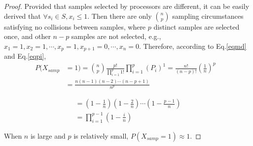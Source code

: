 \documentclass[sigconf]{acmart}
\begin{document}
\begin{proof}
Provided that samples selected by processors are different, it can be easily derived that $\forall s_i \in S, x_i \le 1.$
Then there are only $\binom {n} {p} $ sampling circumstances satisfying no collisions between samples, where  $p$ distinct samples are selected once, and other $n-p$ samples are not selected, e.g., $x_1=1,x_2=1,\cdots, x_{p}=1, x_{p+1}=0,\cdots,x_{n}=0$.
Therefore, according to Eq.\eqref{eqmd} and Eq.\eqref{eqpi}, 
\begin{align}
P(X_{samp}&=1) =\binom {n} {p}  \frac{p!}{\prod \limits_{i=1}^{p}1!}\prod \limits_{i=1}^{p} (P_{i})^1 
=\frac{n!} {(n-p)!} ( \frac{1}{n} )^{p}&\nonumber\\
&=\frac{n (n-1)(n-2) \cdots (n-p+1)}{{n}^{p}} &\nonumber
\end{align}

\begin{align}
&=(1-\frac{1}{n})(1-\frac{2}{n})\cdots(1-\frac{p-1}{n}) &\nonumber\\
&= \prod \limits_{i=1}^{p-1}(1-\frac{i}{n})&\nonumber
\end{align}

When $n$ is large and $p$ is relatively small, $P(X_{samp}=1) \approx 1$. 
\end{proof}
\end{document}
